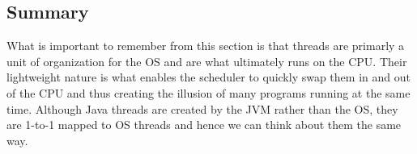 \documentclass[main]{subfiles}
\begin{document}

\subsection{Summary}
What is important to remember from this section is that threads are primarly a unit of organization for the OS and are what ultimately runs on the CPU. Their lightweight nature is what enables the scheduler to quickly swap them in and out of the CPU and thus creating the illusion of many programs running at the same time. Although Java threads are created by the JVM rather than the OS, they are 1-to-1 mapped to OS threads and hence we can think about them the same way.
\end{document}
